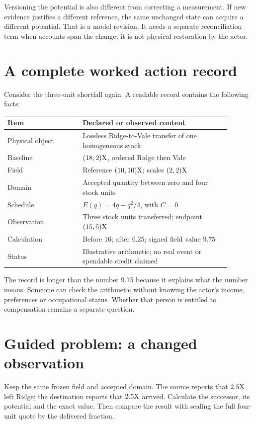 Versioning the potential is also different from correcting a measurement. If new evidence justifies a different reference, the same unchanged state can acquire a different potential. That is a model revision. It needs a separate reconciliation term when accounts span the change; it is not physical restoration by the actor.

\section{A complete worked action record}
Consider the three-unit shortfall again. A readable record contains the following facts:
\begin{center}\small
\begin{tabular}{P{0.30\linewidth}P{0.59\linewidth}}\toprule
Item & Declared or observed content\\\midrule
Physical object & Lossless Ridge-to-Vale transfer of one homogeneous stock\\
Baseline & $(18,2)\mathrm{X}$, ordered Ridge then Vale\\
Field & Reference $(10,10)\mathrm{X}$; scales $(2,2)\mathrm{X}$\\
Domain & Accepted quantity between zero and four stock units\\
Schedule & $E(q)=4q-q^2/4$, with $C=0$\\
Observation & Three stock units transferred; endpoint $(15,5)\mathrm{X}$\\
Calculation & Before $16$; after $6.25$; signed field value $9.75$\\
Status & Illustrative arithmetic; no real event or spendable credit claimed\\\bottomrule
\end{tabular}
\end{center}
The record is longer than the number 9.75 because it explains what the number means. Someone can check the arithmetic without knowing the actor's income, preferences or occupational status. Whether that person is entitled to compensation remains a separate question.

\section{Guided problem: a changed observation}
Keep the same frozen field and accepted domain. The source reports that $2.5\mathrm{X}$ left Ridge; the destination reports that $2.5\mathrm{X}$ arrived. Calculate the successor, its potential and the exact value. Then compare the result with scaling the full four-unit quote by the delivered fraction.

